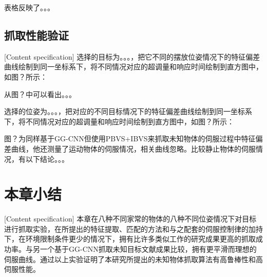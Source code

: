\documentclass[fontset=fandol,type=bachelor,campus=harbin]{hithesisbook}
\begin{document}
{\color{red}表格反映了。。。}
\subsection{抓取性能验证}[Content specification]
选择的目标为。。。，把它不同的摆放位姿情况下的特征偏差曲线绘制到同一坐标系下，将不同情况对应的超调量和响应时间绘制到直方图中，{\color{red}如图？所示：}


{\color{red}从图？中可以看出。。。}


{\color{red}选择的位姿为。。。，把对应的不同目标情况下的特征偏差曲线绘制到同一坐标系下，将不同情况对应的超调量和响应时间绘制到直方图中，如图？所示：}


{\color{red}图？}为同样基于GG-CNN但使用PBVS+IBVS来抓取未知物体的伺服过程中特征偏差曲线，他还测量了运动物体的伺服情况，相关曲线忽略。比较静止物体的伺服情况，{\color{red}有以下结论。。。}
\section{本章小结}[Content specification]
本章在八种不同家常的物体的八种不同位姿情况下对目标进行抓取实验，在所提出的特征提取、匹配的方法和与之配套的伺服控制律的加持下，在环境限制条件更少的情况下，拥有比许多类似工作的研究成果更高的抓取成功率。与另一个基于GG-CNN抓取未知目标文献成果比较，拥有更平滑而理想的伺服曲线。通过以上实验证明了本研究所提出的未知物体抓取算法有高鲁棒性和高伺服性能。
%

\backmatter

%

\end{document}
